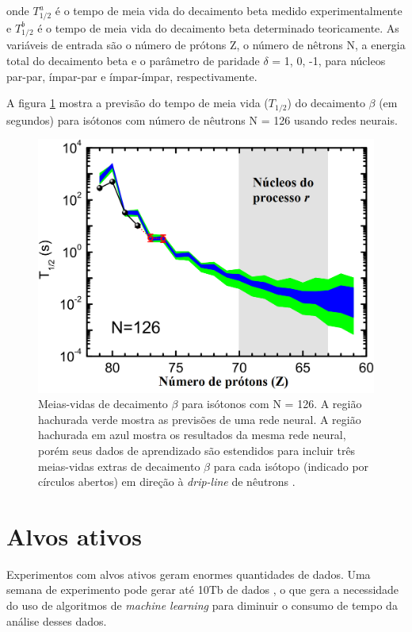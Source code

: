 \documentclass[a4paper,12pt,oneside]{book}
\begin{document}
\begin{appendices}
onde $T^{a}_{1/2}$ é o tempo de meia vida do decaimento beta medido experimentalmente e $T^{b}_{1/2}$ é o tempo de meia vida do decaimento beta determinado teoricamente. As variáveis de entrada são o número de prótons Z, o número de nêtrons N, a energia total do decaimento beta e o parâmetro de paridade $\delta$ = 1, 0, -1, para núcleos par-par, ímpar-par e ímpar-ímpar, respectivamente.

\par A figura \ref{fig:beta_decay} mostra a previsão do tempo de meia vida ($T_{1/2}$) do decaimento $\beta$ (em segundos) para isótonos com número de nêutrons N = 126 usando redes neurais.

\begin{figure}[H]
    \centering
    \includegraphics[scale = 0.35]{figs/beta_predict_2.png}
    \caption{Meias-vidas de decaimento $\beta$ para isótonos com N = 126. A região hachurada verde mostra as previsões de uma rede neural. A região hachurada em azul mostra os resultados da mesma rede neural, porém seus dados de aprendizado são estendidos para incluir três meias-vidas extras de decaimento $\beta$ para cada isótopo (indicado por círculos abertos) em direção à \textit{drip-line} de nêutrons \cite{mlbetadecay}.}
    \label{fig:beta_decay}
\end{figure}

\section{Alvos ativos}

\par Experimentos com alvos ativos geram enormes quantidades de dados. Uma semana de experimento pode gerar até 10Tb de dados \cite{KUCHERAML}, o que gera a necessidade do uso de algoritmos de \textit{machine learning} para diminuir o consumo de tempo da análise desses dados.


\end{appendices}
\end{document}

